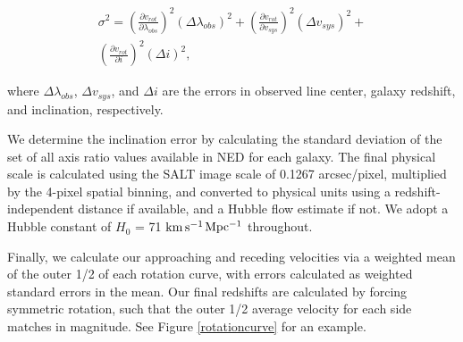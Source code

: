 \documentclass[iop]{emulateapj-rtx4}
\newcommand{\kms}{$\rm km\, s^{-1}$}
\begin{document}
\begin{equation}
\begin{split}
	\sigma^2 = \left( \frac{\partial v_{rot}}{\partial \lambda_{obs}} \right)^2 (\Delta \lambda_{obs})^2 + \left(\frac{\partial v_{rot}}{\partial v_{sys}} \right)^2 (\Delta v_{sys})^2 + \\
	\left( \frac{\partial v_{rot}}{\partial i} \right)^2 (\Delta i)^2,
\end{split}
\end{equation}

\noindent where $\Delta \lambda_{obs}$, $\Delta v_{sys}$, and $\Delta i$ are the errors in observed line center, galaxy redshift, and inclination, respectively. 

We determine the inclination error by calculating the standard deviation of the set of all axis ratio values available in NED for each galaxy. The final physical scale is calculated using the SALT image scale of 0.1267 arcsec/pixel, multiplied by the 4-pixel spatial binning, and converted to physical units using a redshift-independent distance if available, and a Hubble flow estimate if not. We adopt a Hubble constant of $H_0$ = 71 \kms $\rm Mpc^{-1}$ throughout.

Finally, we calculate our approaching and receding velocities via a weighted mean of the outer 1/2 of each rotation curve, with errors calculated as weighted standard errors in the mean. Our final redshifts are calculated by forcing symmetric rotation, such that the outer 1/2 average velocity for each side matches in magnitude. See Figure \ref{rotationcurve} for an example.

\end{document}
